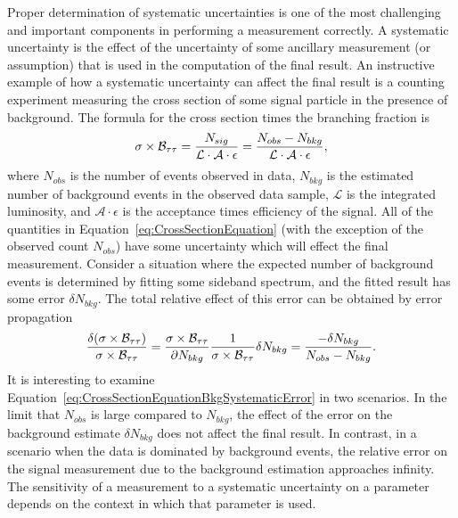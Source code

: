 Proper determination of systematic uncertainties is one of the most challenging
and important components in performing a measurement correctly.  A systematic
uncertainty is the effect of the uncertainty of some ancillary measurement (or
assumption) that is used in the computation of the final result.  An instructive
example of how a systematic uncertainty can affect the final result is a
counting experiment measuring the cross section of some signal particle in the
presence of background.  The formula for the cross section times the branching
fraction is
\begin{equation}
  \mbox{\ensuremath{\sigma \times {\cal B}_{\tau\tau}}} = \frac{N_{sig}}{\mathcal{L} \cdot \mathcal {A} \cdot
  \epsilon} = \frac{N_{obs}-N_{bkg}}{\mathcal{L} \cdot \mathcal {A} \cdot
  \epsilon}, \label{eq:CrossSectionEquation}
\end{equation}
where $N_{obs}$ is the number of events observed in data, $N_{bkg}$ is the
estimated number of background events in the observed data sample, $\mathcal{L}$
is the integrated luminosity, and $\mathcal{A} \cdot \epsilon$ is the acceptance
times efficiency of the signal.  All of the quantities in
Equation~\ref{eq:CrossSectionEquation} (with the exception of the observed
count $N_{obs}$) have some uncertainty which will effect the final measurement.
Consider a situation where the expected number of background events is
determined by fitting some sideband spectrum, and the fitted result has some
error $\delta N_{bkg}$.  The total relative effect of this error can
be obtained by error propagation
\begin{equation}
  \frac{\delta (\mbox{\ensuremath{\sigma \times {\cal B}_{\tau\tau}}})}{\mbox{\ensuremath{\sigma \times {\cal B}_{\tau\tau}}}} = \frac{\mbox{\ensuremath{\sigma \times {\cal B}_{\tau\tau}}}}{\partial N_{bkg}}  \frac{1}{\mbox{\ensuremath{\sigma \times {\cal B}_{\tau\tau}}}} \delta N_{bkg} =
  \frac{-\delta N_{bkg}} {N_{obs}-N_{bkg}}.
  \label{eq:CrossSectionEquationBkgSystematicError}
\end{equation}
It is interesting to examine
Equation~\ref{eq:CrossSectionEquationBkgSystematicError} in two scenarios.  In
the limit that $N_{obs}$ is large compared to $N_{bkg}$, the effect of the error
on the background estimate $\delta N_{bkg}$ does not affect the final result.
In contrast, in a scenario when the data is dominated by background events, the
relative error on the signal measurement due to the background estimation
approaches infinity.  The sensitivity of a measurement to a systematic
uncertainty on a parameter depends on the context in which that parameter is
used.

